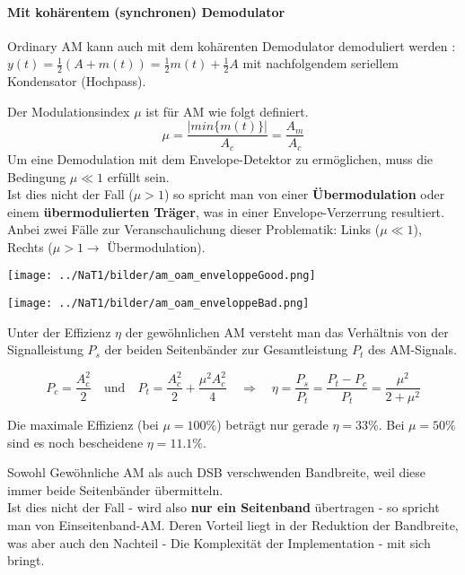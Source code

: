 \paragraph{Mit kohärentem (synchronen) Demodulator}
Ordinary AM kann auch mit dem kohärenten Demodulator demoduliert werden
:
$y(t) = \frac12 (A + m(t)) = \frac12 m(t) + \frac12 A$ mit nachfolgendem
seriellem Kondensator (Hochpass).


Der Modulationsindex $\mu$ ist für AM wie folgt definiert.
$$\mu = \frac{|min\{m(t)\}|}{A_c} = \frac{A_m}{A_c} $$
Um eine Demodulation mit dem Envelope-Detektor zu ermöglichen, muss die Bedingung 
\textbf{$\mu \ll 1$} erfüllt sein. \\
Ist dies nicht der Fall (\textbf{$\mu > 1$}) so spricht man von einer \textbf{Übermodulation} oder
einem  \textbf{übermodulierten Träger}, was in einer Envelope-Verzerrung resultiert. \\
Anbei zwei Fälle zur Veranschaulichung dieser Problematik: Links ($\mu \ll 1$), Rechts ($\mu > 1
\rightarrow $ Übermodulation).

\begin{minipage}[t][2.3cm][c]{9.5cm}
	\begin{center}
      \texttt{[image: ../NaT1/bilder/am\_oam\_enveloppeGood.png]}
	\end{center}
\end{minipage}
\begin{minipage}[t][2.3cm][c]{9.5cm}
    \begin{center}
    	\texttt{[image: ../NaT1/bilder/am\_oam\_enveloppeBad.png]}
	\end{center}
\end{minipage}

Unter der Effizienz $ \eta $ der gewöhnlichen AM versteht man das Verhältnis von der Signalleistung
$P_s$ der beiden Seitenbänder zur Gesamtleistung $P_t$ des AM-Signals.

$$ P_c = \frac{A_c^2}{2} \quad \text{und} \quad P_t = \frac{A_c^2}{2} + \frac{\mu^2 A_c^2}{4}
\quad \Longrightarrow \quad \eta = \frac{P_s}{P_t} = \frac{P_t - P_c}{P_t} = \frac{\mu^2}{2+\mu^2} $$

Die maximale Effizienz (bei $\mu = 100\% $) beträgt nur gerade $ \eta = 33\% $. Bei $\mu = 50\% $
sind es noch bescheidene $\eta = 11.1\% $.

Sowohl Gewöhnliche AM als auch DSB verschwenden Bandbreite, weil diese immer beide Seitenbänder
übermitteln. \\
Ist dies nicht der Fall - wird also \textbf{nur ein Seitenband} übertragen - so spricht man von
Einseitenband-AM. Deren Vorteil liegt in der Reduktion der Bandbreite, was aber auch den Nachteil
- Die Komplexität der Implementation - mit sich bringt.

